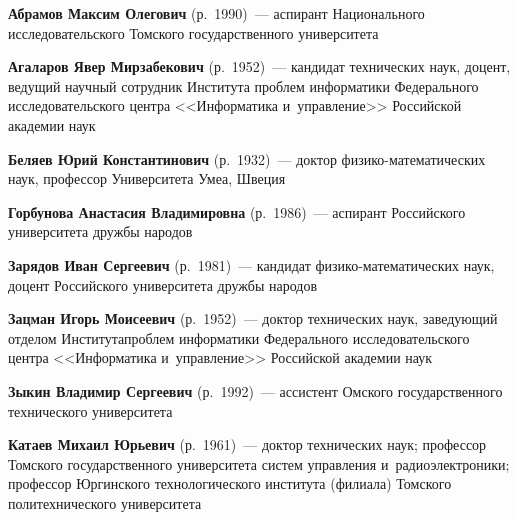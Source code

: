\begin{multicols}{2}

\noindent
\textbf{Абрамов Максим Олегович} (р.\ 1990)~---
 аспирант Национального исследовательского Томского государственного
 университета

 \vspace*{2pt}
 
\noindent
\textbf{Агаларов Явер Мирзабекович} (р.\ 1952)~--- кандидат технических наук, 
доцент, ведущий научный сотрудник Института проблем информатики 
Федерального исследовательского центра <<Информатика и~управ\-ле\-ние>> 
Российской академии наук
 
 \vspace*{2pt}
 
 \noindent
 \textbf{Беляев Юрий Константинович} (р.\ 1932)~--- доктор
 фи\-зи\-ко-математических наук, профессор Университета Умеа, Швеция
 
 \vspace*{2pt}
 
 \noindent
  \textbf{Горбунова Анастасия Владимировна} (р.\ 1986)~---
   аспирант Российского университета дружбы народов
   
   \vspace*{2pt}
   
   \noindent
  \textbf{Зарядов Иван Сергеевич} (р.\ 1981)~---
  кандидат фи\-зи\-ко-ма\-те\-ма\-ти\-че\-ских наук, 
  доцент Российского университета дружбы народов

\vspace*{2pt}

\noindent
\textbf{Зацман Игорь Моисеевич} (р.\ 1952)~---
 доктор технических наук, заведующий отделом Института\linebreak проб\-лем 
 информатики Федерального исследовательского центра <<Информатика и~управ\-ле\-ние>> 
 Российской академии наук 

\vspace*{2pt}

 \noindent
\textbf{Зыкин Владимир Сергеевич} (р.\ 1992)~--- ассистент Омского
государственного технического университета

 \vspace*{2pt}

\noindent
\textbf{Катаев Михаил Юрьевич} (р.\ 1961)~--- доктор технических
наук; профессор Томского государственного университета систем управления
и~радиоэлектроники; профессор Юргинского технологического института (филиала)
Томского политехнического университета


\end{multicols}
